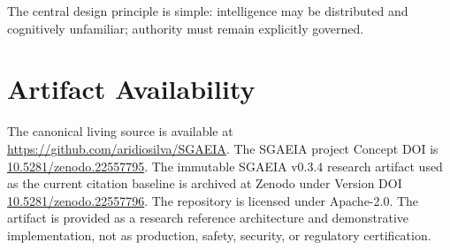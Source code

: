 \documentclass[11pt]{article}
\newcommand{\repo}{\url{https://github.com/aridiosilva/SGAEIA}}
\newcommand{\conceptdoi}{\href{https://doi.org/10.5281/zenodo.22557795}{10.5281/zenodo.22557795}}
\newcommand{\versiondoi}{\href{https://doi.org/10.5281/zenodo.22557796}{10.5281/zenodo.22557796}}
\begin{document}
The central design principle is simple: intelligence may be distributed and cognitively unfamiliar; authority must remain explicitly governed.

\section*{Artifact Availability}
The canonical living source is available at \repo. The SGAEIA project Concept DOI is \conceptdoi. The immutable SGAEIA v0.3.4 research artifact used as the current citation baseline is archived at Zenodo under Version DOI \versiondoi. The repository is licensed under Apache-2.0. The artifact is provided as a research reference architecture and demonstrative implementation, not as production, safety, security, or regulatory certification.



\end{document}
